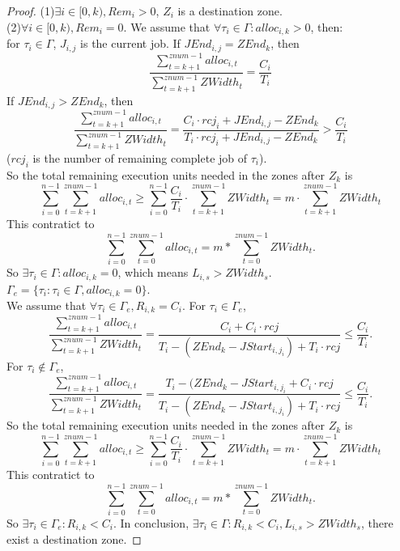 \documentclass{article}
\begin{document}
\begin{proof}
	(1)$\exists i \in [0,k), Rem_i>0$, $Z_i$ is a destination zone. \\
	(2)$\forall i \in [0,k), Rem_i=0$. We assume that $\forall \tau_i \in \Gamma : alloc_{i,k}>0$, then: \\
		for $\tau_i \in \Gamma$, $J_{i,j}$ is the current job. If $JEnd_{i,j} = ZEnd_k$, then
		\[
			\dfrac{\sum\limits_{t=k+1}^{znum-1} alloc_{i,t}}{\sum\limits_{t=k+1}^{znum-1} ZWidth_t} 
			= \dfrac{C_i}{T_i}
		\]
		If $JEnd_{i,j}>ZEnd_k$, then
		\[
			\dfrac{\sum\limits_{t=k+1}^{znum-1} alloc_{i,t}}{\sum\limits_{t=k+1}^{znum-1} ZWidth_t}
			= \dfrac{C_i \cdot rcj_i + JEnd_{i,j} - ZEnd_k}{T_i \cdot rcj_i + JEnd_{i,j} - ZEnd_k}
			> \dfrac{C_i}{T_i}
		\]
		($rcj_i$ is the number of remaining complete job of $\tau_i$).\\
		So the total remaining execution units needed in the zones after $Z_k$ is 
		\[
			\sum\limits_{i=0}^{n-1} \sum\limits_{t=k+1}^{znum-1} alloc_{i,t} \geq 
			\sum\limits_{i=0}^{n-1} \dfrac{C_i}{T_i} \cdot \sum\limits_{t=k+1}^{znum-1} ZWidth_t =
			m \cdot \sum\limits_{t=k+1}^{znum-1} ZWidth_t
		\]
		This contratict to 
		\[
			\sum\limits_{i=0}^{n-1} \sum\limits_{t=0}^{znum-1} alloc_{i,t} =
			m * \sum\limits_{t=0}^{znum-1} ZWidth_t .
		\]
		So $\exists \tau_i \in \Gamma : alloc_{i,k} = 0$, which means $L_{i,s} > ZWidth_s$.
		$\Gamma_e = \{ \tau_i : \tau_i \in \Gamma , alloc_{i,k}=0 \}$. \\

		We assume that $\forall \tau_i \in \Gamma_e, R_{i,k} = C_i$.
		For $\tau_i \in \Gamma_e$, 
		\[
			\dfrac{\sum\limits_{t=k+1}^{znum-1} alloc_{i,t}}{\sum\limits_{t=k+1}^{znum-1} ZWidth_t} =
			\dfrac{C_i + C_i \cdot rcj}{T_i-(ZEnd_k-JStart_{i,j_i}) + T_i \cdot rcj} \leq
			\dfrac{C_i}{T_i} .
		\]
		For $\tau_i \notin \Gamma_e$,
		\[
			\dfrac{\sum\limits_{t=k+1}^{znum-1} alloc_{i,t}}{\sum\limits_{t=k+1}^{znum-1} ZWidth_t} =
			\dfrac{T_i - (ZEnd_k-JStart_{i,j_i} + C_i \cdot rcj}{T_i-(ZEnd_k-JStart_{i,j_i}) + T_i \cdot rcj} \leq
			\dfrac{C_i}{T_i} .
		\]
		So the total remaining execution units needed in the zones after $Z_k$ is
		\[
			\sum\limits_{i=0}^{n-1} \sum\limits_{t=k+1}^{znum-1} alloc_{i,t} \geq 
			\sum\limits_{i=0}^{n-1} \dfrac{C_i}{T_i} \cdot \sum\limits_{t=k+1}^{znum-1} ZWidth_t =
			m \cdot \sum\limits_{t=k+1}^{znum-1} ZWidth_t
		\]
		This contratict to 
		\[
			\sum\limits_{i=0}^{n-1} \sum\limits_{t=0}^{znum-1} alloc_{i,t} =
			m * \sum\limits_{t=0}^{znum-1} ZWidth_t .
		\]
		So $\exists \tau_i \in \Gamma_e : R_{i,k} < C_i$.
		In conclusion, $\exists \tau_i \in \Gamma : R_{i,k} < C_i, L_{i,s} > ZWidth_s$, there exist a destination zone.
\end{proof}
\end{document}
